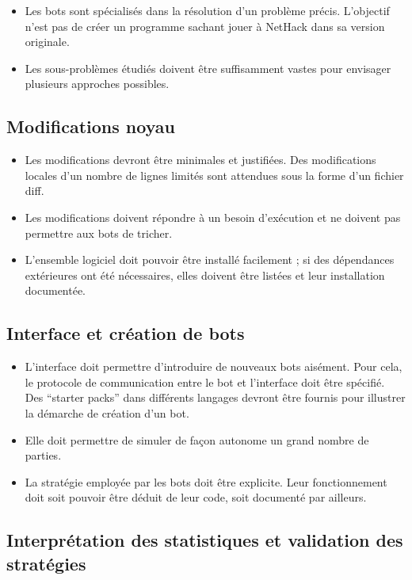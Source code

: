 \documentclass[12pt]{article}
\begin{document}
\begin{itemize}
\item
  Les bots sont spécialisés dans la résolution d'un problème précis.
  L'objectif n'est pas de créer un programme sachant jouer à NetHack
  dans sa version originale.
\item
  Les sous-problèmes étudiés doivent être suffisamment vastes pour
  envisager plusieurs approches possibles.
\end{itemize}

\subsection{Modifications noyau}

\begin{itemize}
\item
  Les modifications devront être minimales et justifiées. Des
  modifications locales d'un nombre de lignes limités sont attendues
  sous la forme d'un fichier diff.
\item
  Les modifications doivent répondre à un besoin d'exécution et ne
  doivent pas permettre aux bots de tricher.
\item
  L'ensemble logiciel doit pouvoir être installé facilement ; si des
  dépendances extérieures ont été nécessaires, elles doivent être
  listées et leur installation documentée.
\end{itemize}

\subsection{Interface et création de bots}

\begin{itemize}
\item
  L'interface doit permettre d'introduire de nouveaux bots aisément.
  Pour cela, le protocole de communication entre le bot et l'interface
  doit être spécifié. Des ``starter packs'' dans différents langages
  devront être fournis pour illustrer la démarche de création d'un bot.
\item
  Elle doit permettre de simuler de façon autonome un grand nombre de
  parties.
\item
  La stratégie employée par les bots doit être explicite. Leur
  fonctionnement doit soit pouvoir être déduit de leur code, soit
  documenté par ailleurs.
\end{itemize}

\subsection{Interprétation des statistiques et validation des
stratégies}
\end{document}
